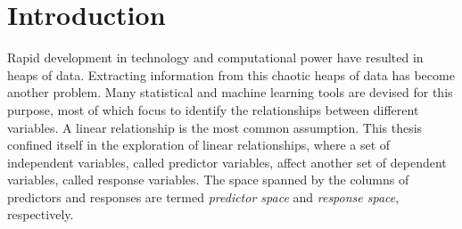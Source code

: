 \documentclass[11pt,twoside,openright,titlepage,
  headinclude,footinclude,BCOR=5mm,
  numbers=noenddot,cleardoublepage=empty,
  tablecaptionabove, dottedtoc,
  bibliography=totoc,paper=a4]{scrreprt}
\begin{document}
\begingroup
\cleardoublepage
{}

\endgroup

\begingroup
\cleardoublepage
{}

\endgroup


\cleardoublepage
{}
{}
\setcounter{tocdepth}{1}
\begingroup 
  \let\clearpage\relax
  \let\cleardoublepage\relax
    \tableofcontents
\endgroup
\markboth{\spacedlowsmallcaps{\contentsname}}
{\spacedlowsmallcaps{\contentsname}} 

\begingroup

\setcounter{secnumdepth}{-\maxdimen} %

\listoffigures
\vfill
\endgroup

\begingroup 
  \let\clearpage\relax
  \let\cleardoublepage\relax
\endgroup

\cleardoublepage



\pagestyle{scrheadings} 

\hypertarget{introduction}{%
\chapter{Introduction}\label{introduction}}

Rapid development in technology and computational power have resulted in heaps of data. Extracting information from this chaotic heaps of data has become another problem. Many statistical and machine learning tools are devised for this purpose, most of which focus to identify the relationships between different variables. A linear relationship is the most common assumption. This thesis confined itself in the exploration of linear relationships, where a set of independent variables, called predictor variables, affect another set of dependent variables, called response variables. The space spanned by the columns of predictors and responses are termed \emph{predictor space} and \emph{response space}, respectively.
\end{document}
